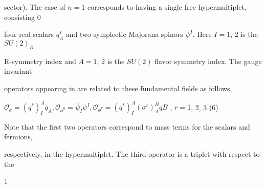 \documentclass[a4paper,12pt]{article}
\begin{document}
sector). The case of $n= 1$ corresponds to having a single free hypermultiplet, consisting $0$

four real scalars $q_{A}^{I}$ and two symplectic Majorana spinors $\psi^{I}$. Here $I= 1$, 2 is the $SU(2)_{R}$

$\mathrm{R}$-symmetry index and $A= 1$, 2 is the $SU(2)$ flavor symmetry index. The gauge invariant

operators appearing in are related to these fundamental fields as follows,
\begin{center}
$\mathcal{O}_{\sigma}=(q^{*})_{I}^{A}q_{A}, \mathcal{O}_{\phi^{0}}=\overline{\psi}_{I}\psi^{I}, \mathcal{O}_{\phi^{r}}=(q^{*})_{I}^{A}(\sigma^{r})_{A}^{B}q B$ , $r=1$, 2, 3   (6)
\end{center}
Note that the first two operators correspond to mass terms for the scalars and fermions,

respectively, in the hypermultiplet. The third operator is a triplet with respect to the

1
\end{document}
